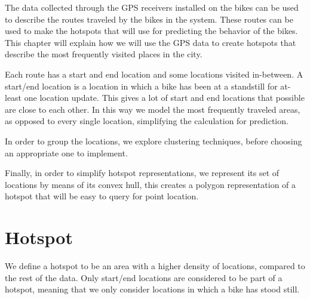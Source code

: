 The data collected through the GPS receivers installed on the bikes can be used to describe the routes traveled by the bikes in the system.
These routes can be used to make the hotspots that \projectname{} will use for predicting the behavior of the bikes.
This chapter will explain how we will use the GPS data to create hotspots that describe the most frequently visited places in the city.

Each route has a start and end location and some locations visited in-between. A start/end location is a location in which a bike has been at a standstill for at-least one location update.
This gives a lot of start and end locations that possible are close to each other.
In this way we model the most frequently traveled areas, as opposed to every single location, simplifying the calculation for prediction.

In order to group the locations, we explore clustering techniques, before choosing an appropriate one to implement.

Finally, in order to simplify hotspot representations, we represent its set of locations by means of its convex hull, this creates a polygon representation of a hotspot that will be easy to query for point location.

\section{Hotspot}\label{hotspot}
We define a hotspot to be an area with a higher density of locations, compared to the rest of the data. Only start/end locations are considered to be part of a hotspot, meaning that we only consider locations in which a bike has stood still.
